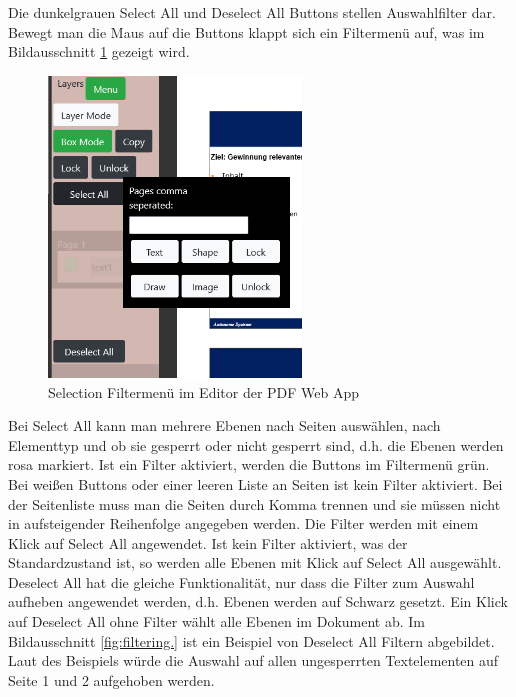Die dunkelgrauen Select All und Deselect All Buttons stellen Auswahlfilter dar. Bewegt man die Maus auf die Buttons klappt sich ein Filtermenü auf, was im Bildausschnitt \ref{fig:filtermenu} gezeigt wird. 

\begin{figure}[!htbp]
	\centering
	\includegraphics[width=0.6\textwidth]{"images/filtermenu.png"}
	\caption{Selection Filtermenü im Editor der PDF Web App}
	\label{fig:filtermenu}
\end{figure}

Bei Select All kann man mehrere Ebenen nach Seiten auswählen, nach Elementtyp und ob sie gesperrt oder nicht gesperrt sind, d.h. die Ebenen werden rosa markiert. Ist ein Filter aktiviert, werden die Buttons im Filtermenü grün. Bei weißen Buttons oder einer leeren Liste an Seiten ist kein Filter aktiviert. Bei der Seitenliste muss man die Seiten durch Komma trennen und sie müssen nicht in aufsteigender Reihenfolge angegeben werden. Die Filter werden mit einem Klick auf Select All angewendet. Ist kein Filter aktiviert, was der Standardzustand ist, so werden alle Ebenen mit Klick auf Select All ausgewählt. Deselect All hat die gleiche Funktionalität, nur dass die Filter zum Auswahl aufheben angewendet werden, d.h. Ebenen werden auf Schwarz gesetzt. Ein Klick auf Deselect All ohne Filter wählt alle Ebenen im Dokument ab. Im Bildausschnitt \ref{fig:filtering.} ist ein Beispiel von Deselect All Filtern abgebildet. Laut des Beispiels würde die Auswahl auf allen ungesperrten Textelementen auf Seite 1 und 2 aufgehoben werden. 

